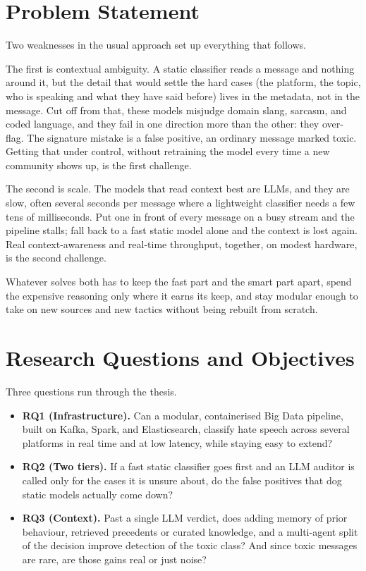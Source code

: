 \section{Problem Statement}\label{problem-statement}

Two weaknesses in the usual approach set up everything that follows.

The first is contextual ambiguity. A static classifier reads a message and nothing around it, but the detail that would settle the hard cases (the platform, the topic, who is speaking and what they have said before) lives in the metadata, not in the message. Cut off from that, these models misjudge domain slang, sarcasm, and coded language, and they fail in one direction more than the other: they over-flag. The signature mistake is a false positive, an ordinary message marked toxic. Getting that under control, without retraining the model every time a new community shows up, is the first challenge.

The second is scale. The models that read context best are LLMs, and they are slow, often several seconds per message where a lightweight classifier needs a few tens of milliseconds. Put one in front of every message on a busy stream and the pipeline stalls; fall back to a fast static model alone and the context is lost again. Real context-awareness and real-time throughput, together, on modest hardware, is the second challenge.

Whatever solves both has to keep the fast part and the smart part apart, spend the expensive reasoning only where it earns its keep, and stay modular enough to take on new sources and new tactics without being rebuilt from scratch.

\section{Research Questions and Objectives}\label{research-questions-and-objectives}

Three questions run through the thesis.

\begin{itemize}
\tightlist
\item \textbf{RQ1 (Infrastructure).} Can a modular, containerised Big Data pipeline, built on Kafka, Spark, and Elasticsearch, classify hate speech across several platforms in real time and at low latency, while staying easy to extend?
\item \textbf{RQ2 (Two tiers).} If a fast static classifier goes first and an LLM auditor is called only for the cases it is unsure about, do the false positives that dog static models actually come down?
\item \textbf{RQ3 (Context).} Past a single LLM verdict, does adding memory of prior behaviour, retrieved precedents or curated knowledge, and a multi-agent split of the decision improve detection of the toxic class? And since toxic messages are rare, are those gains real or just noise?
\end{itemize}

